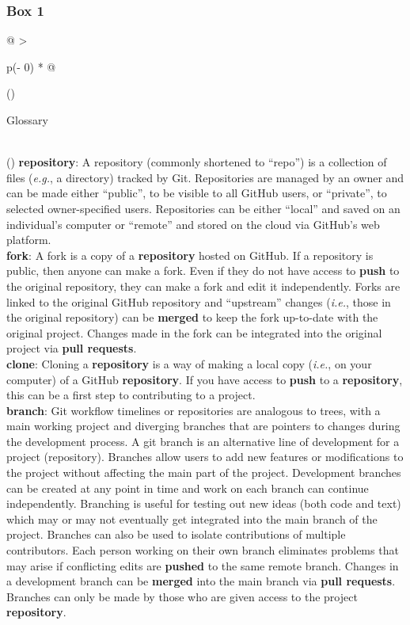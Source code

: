 \hypertarget{definitions}{%
\subsubsection{Box 1}\label{definitions}}

\begin{tablenos:no-prefix-table-caption}

\begin{longtable}[]{@{}
  >{\raggedright\arraybackslash}p{(\columnwidth - 0\tabcolsep) * }@{}}
\toprule()
\begin{minipage}[b]{\linewidth}\raggedright
Glossary
\end{minipage} \\
\midrule()
\endhead
\textbf{repository}: A repository (commonly shortened to ``repo'') is a collection of files (\emph{e.g.}, a directory) tracked by Git. Repositories are managed by an owner and can be made either ``public'', to be visible to all GitHub users, or ``private'', to selected owner-specified users. Repositories can be either ``local'' and saved on an individual's computer or ``remote'' and stored on the cloud via GitHub's web platform. \\
\textbf{fork}: A fork is a copy of a \textbf{repository} hosted on GitHub. If a repository is public, then anyone can make a fork. Even if they do not have access to \textbf{push} to the original repository, they can make a fork and edit it independently. Forks are linked to the original GitHub repository and ``upstream'' changes (\emph{i.e.}, those in the original repository) can be \textbf{merged} to keep the fork up-to-date with the original project. Changes made in the fork can be integrated into the original project via \textbf{pull requests}. \\
\textbf{clone}: Cloning a \textbf{repository} is a way of making a local copy (\emph{i.e.}, on your computer) of a GitHub \textbf{repository}. If you have access to \textbf{push} to a \textbf{repository}, this can be a first step to contributing to a project. \\
\textbf{branch}: Git workflow timelines or repositories are analogous to trees, with a main working project and diverging branches that are pointers to changes during the development process. A git branch is an alternative line of development for a project (repository). Branches allow users to add new features or modifications to the project without affecting the main part of the project. Development branches can be created at any point in time and work on each branch can continue independently. Branching is useful for testing out new ideas (both code and text) which may or may not eventually get integrated into the main branch of the project. Branches can also be used to isolate contributions of multiple contributors. Each person working on their own branch eliminates problems that may arise if conflicting edits are \textbf{pushed} to the same remote branch. Changes in a development branch can be \textbf{merged} into the main branch via \textbf{pull requests}. Branches can only be made by those who are given access to the project \textbf{repository}. \\

\end{longtable}
\end{tablenos:no-prefix-table-caption}
